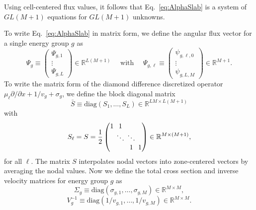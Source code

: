 Using cell-centered flux values, it follows that Eq.~\ref{eq:AlphaSlab} is a system of $GL(M+1)$ equations for $GL(M+1)$ unknowns. 


To write Eq.~\ref{eq:AlphaSlab} in matrix form, we define the angular flux vector for a single energy group $g$ as
\begin{equation}
\Psi_{g} \equiv 
\begin{pmatrix}
\Psi_{g,1} \\
\vdots \\
\Psi_{g,L}
\end{pmatrix} \in \mathbb{R}^{L(M+1)} \quad \text{ with } \quad
\Psi_{g, \ell} \equiv 
\begin{pmatrix}
\psi_{g,\ell,0} \\
\vdots \\
\psi_{g,L,M}
\end{pmatrix} \in \mathbb{R}^{M+1}.
\end{equation}
To write the matrix form of the diamond difference discretized operator $\mu_{\ell} \partial/\partial x + 1/v_{g} + \sigma_{g}$, we define the block diagonal matrix
\begin{equation}
\bar{S} \equiv \text{diag}(S_{1}, \dots, S_{L}) \in \mathbb{R}^{LM \times L(M+1)}
\end{equation}
with
\begin{equation}
S_{\ell} = S = \frac{1}{2}
\setlength\arraycolsep{2pt}
\begin{pmatrix}
1 & 1 & & \\
& \ddots & \ddots & \\
& & 1 & 1
\end{pmatrix} \in \mathbb{R}^{M \times (M+1)},
\end{equation}
for all $\ell$. The matrix $S$ interpolates nodal vectors into zone-centered vectors by averaging the nodal values. Now we define the total cross section and inverse velocity matrices for energy group $g$ as
\begin{equation}
	\Sigma_{g}  \equiv \text{diag}(\sigma_{g,1},\dots,\sigma_{g,M}) \in \mathbb{R}^{M \times M},
\end{equation}
\begin{equation}
	V^{-1}_{g}  \equiv \text{diag}(1/v_{g,1},\dots,1/v_{g,M}) \in \mathbb{R}^{M \times M}.
\end{equation}
